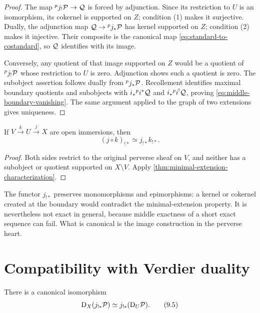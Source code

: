 \begin{proof}
The map \({}^pj_!\mathcal P\to\mathcal Q\) is forced by adjunction.  Since its restriction
to \(U\) is an isomorphism, its cokernel is supported on \(Z\); condition (1)
makes it surjective.  Dually, the adjunction map
\(\mathcal Q\to{}^pj_*\mathcal P\) has kernel supported on \(Z\); condition (2) makes it
injective.  Their composite is the canonical map
\eqref{eq:standard-to-costandard}, so \(\mathcal Q\) identifies with its image.

Conversely, any quotient of that image supported on \(Z\) would be a quotient
of \({}^pj_!\mathcal P\) whose restriction to \(U\) is zero.  Adjunction shows such a
quotient is zero.  The subobject assertion follows dually from
\({}^pj_*\mathcal P\).  Recollement identifies maximal boundary quotients and
subobjects with \(i_*{}^pi^*\mathcal Q\) and \(i_*{}^pi^!\mathcal Q\), proving
\eqref{eq:middle-boundary-vanishing}.  The same argument applied to the graph
of two extensions gives uniqueness.
\end{proof}

\begin{corollary}[Transitivity]
\label{cor:intermediate-extension-transitivity}
If \(V\xrightarrow{k}U\xrightarrow{j}X\) are open immersions, then
\[
  (j\circ k)_{!*}\simeq j_{!*}k_{!*}.
\]
\end{corollary}

\begin{proof}
Both sides restrict to the original perverse sheaf on \(V\), and neither has a
subobject or quotient supported on \(X\setminus V\).  Apply
\cref{thm:minimal-extension-characterization}.
\end{proof}

\begin{warning}
The functor \(j_{!*}\) preserves monomorphisms and epimorphisms: a kernel or
cokernel created at the boundary would contradict the minimal-extension
property.  It is nevertheless not exact in general, because middle exactness
of a short exact sequence can fail.  What is canonical is the image
construction in the perverse heart.
\end{warning}

\section{Compatibility with Verdier duality}

\begin{proposition}
\label{prop:duality-intermediate-extension}
There is a canonical isomorphism
\[
  \mathrm D_X(j_{!*}\mathcal P)\simeq j_{!*}(\mathrm D_U\mathcal P).
\tag{9.5}\label{eq:duality-jmiddle}
\]
\end{proposition}

